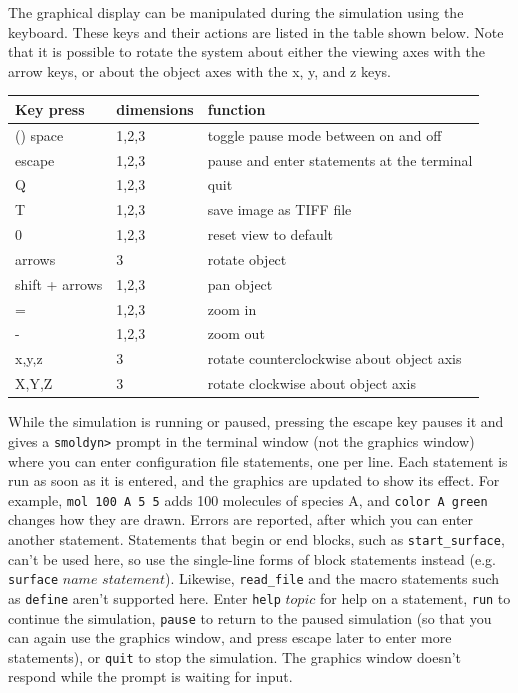 \documentclass {scrbook}
\newcommand {\ttt} {\texttt}
\begin{document}
The graphical display can be manipulated during the simulation using the keyboard. These keys and their actions are listed in the table shown below. Note that it is possible to rotate the system about either the viewing axes with the arrow keys, or about the object axes with the x, y, and z keys.

\begin{longtable}[c]{lll}
Key press & dimensions & function\\
\hline()
space & 1,2,3 & toggle pause mode between on and off\\
escape & 1,2,3 & pause and enter statements at the terminal\\
Q & 1,2,3 & quit\\
T & 1,2,3 & save image as TIFF file\\
0 & 1,2,3 & reset view to default\\
arrows & 3 & rotate object\\
shift + arrows & 1,2,3 & pan object\\
= & 1,2,3 & zoom in\\
- & 1,2,3 & zoom out\\
x,y,z & 3 & rotate counterclockwise about object axis\\
X,Y,Z & 3 & rotate clockwise about object axis\\
\end{longtable}

While the simulation is running or paused, pressing the escape key pauses it and gives a \ttt{smoldyn>} prompt in the terminal window (not the graphics window) where you can enter configuration file statements, one per line. Each statement is run as soon as it is entered, and the graphics are updated to show its effect. For example, \ttt{mol 100 A 5 5} adds 100 molecules of species A, and \ttt{color A green} changes how they are drawn. Errors are reported, after which you can enter another statement. Statements that begin or end blocks, such as \ttt{start\_surface}, can't be used here, so use the single-line forms of block statements instead (e.g. \ttt{surface} $name$ $statement$). Likewise, \ttt{read\_file} and the macro statements such as \ttt{define} aren't supported here. Enter \ttt{help} $topic$ for help on a statement, \ttt{run} to continue the simulation, \ttt{pause} to return to the paused simulation (so that you can again use the graphics window, and press escape later to enter more statements), or \ttt{quit} to stop the simulation. The graphics window doesn't respond while the prompt is waiting for input.
\end{document}
